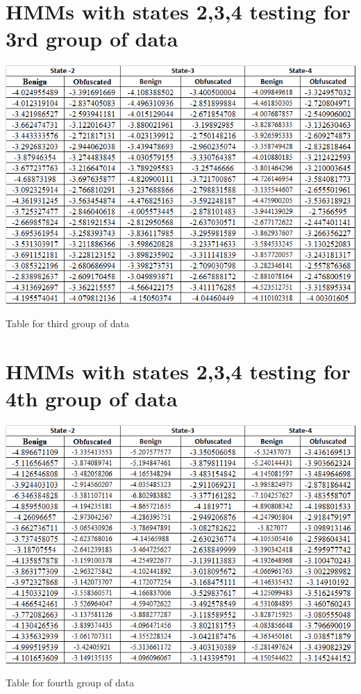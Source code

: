 \section{HMMs with states 2,3,4 testing for 3rd group of data}
\begin{table}
\centering
\includegraphics[width=1.0\textwidth]{images/a3.png}
\caption{Table for third group of data} 
\label{table:Table for third group of data}
\end{table}
\pagebreak

\section{HMMs with states 2,3,4 testing for 4th group of data}
\begin{table}
\centering
\includegraphics[width=1.0\textwidth]{images/a4.png}
\caption{Table for fourth group of data} 
\label{table:Table for fourth group of data}
\end{table}
\pagebreak

